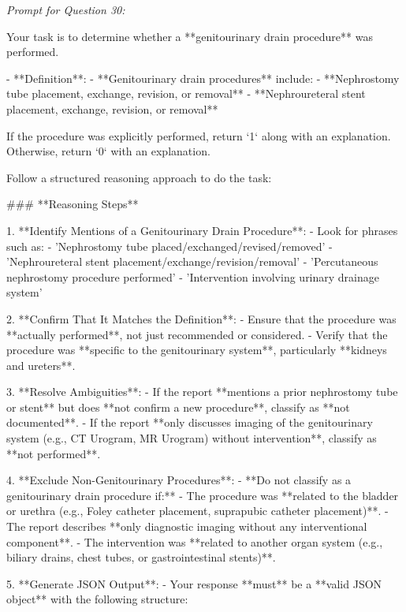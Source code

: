 \textit{\normalsize Prompt for Question  30:}
\begin{mdframed}[]
\normalsize

Your task is to determine whether a **genitourinary drain procedure** was performed.  

- **Definition**:  
  - **Genitourinary drain procedures** include:  
    - **Nephrostomy tube placement, exchange, revision, or removal**  
    - **Nephroureteral stent placement, exchange, revision, or removal**  

If the procedure was explicitly performed, return `1` along with an explanation. Otherwise, return `0` with an explanation.

Follow a structured reasoning approach to do the task:

### **Reasoning Steps**  

1. **Identify Mentions of a Genitourinary Drain Procedure**:  
   - Look for phrases such as:  
     - 'Nephrostomy tube placed/exchanged/revised/removed'  
     - 'Nephroureteral stent placement/exchange/revision/removal'  
     - 'Percutaneous nephrostomy procedure performed'  
     - 'Intervention involving urinary drainage system'  

2. **Confirm That It Matches the Definition**:  
   - Ensure that the procedure was **actually performed**, not just recommended or considered.  
   - Verify that the procedure was **specific to the genitourinary system**, particularly **kidneys and ureters**.  

3. **Resolve Ambiguities**:  
   - If the report **mentions a prior nephrostomy tube or stent** but does **not confirm a new procedure**, classify as **not documented**.  
   - If the report **only discusses imaging of the genitourinary system (e.g., CT Urogram, MR Urogram) without intervention**, classify as **not performed**.  

4. **Exclude Non-Genitourinary Procedures**:  
   - **Do not classify as a genitourinary drain procedure if:**  
     - The procedure was **related to the bladder or urethra (e.g., Foley catheter placement, suprapubic catheter placement)**.  
     - The report describes **only diagnostic imaging without any interventional component**.  
     - The intervention was **related to another organ system (e.g., biliary drains, chest tubes, or gastrointestinal stents)**.  

5. **Generate JSON Output**:  
   - Your response **must** be a **valid JSON object** with the following structure:  

\end{mdframed}

